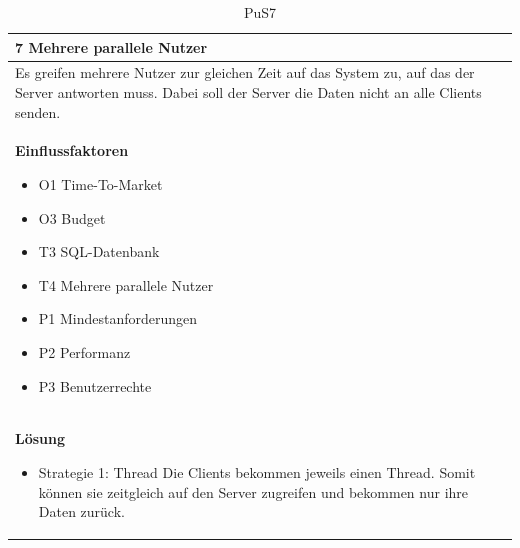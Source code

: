 \documentclass[fontsize=12pt,paper=a4,twoside]{scrartcl}
\begin{document}
\begin{table}[H]
\caption{PuS7}
\begin{tabular}{|p{\textwidth}|}\hline
7 Mehrere parallele Nutzer\\ \hline
Es greifen mehrere Nutzer zur gleichen Zeit auf das System zu, auf das der Server antworten muss. Dabei soll der Server die Daten nicht an alle Clients senden.\\ \hline
\textbf{Einflussfaktoren}
\begin{itemize}
\item O1 Time-To-Market
\item O3 Budget
\item T3 SQL-Datenbank
\item T4 Mehrere parallele Nutzer
\item P1 Mindestanforderungen
\item P2 Performanz
\item P3 Benutzerrechte
\end{itemize}\\ \hline
\textbf{Lösung}
\begin{itemize}
\item Strategie 1: Thread \leavevmode\newline
Die Clients bekommen jeweils einen Thread. Somit können sie zeitgleich auf den Server zugreifen und bekommen nur ihre Daten zurück.
\end{itemize} \\ \hline
\end{tabular}
\end{table}
\end{document}
